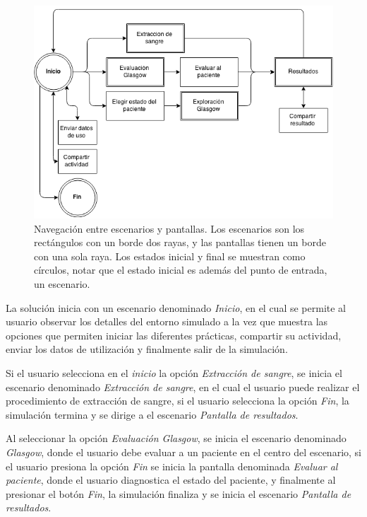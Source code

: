 \begin{figure}[H] 
\centering 
\includegraphics[scale=0.5]{propuesta/grafo_escenas.png}
\caption{Navegación entre escenarios y pantallas. Los escenarios son los
    rectángulos con un borde dos rayas, y las pantallas tienen un borde con una
    sola raya. Los estados inicial y final se muestran como círculos, notar que
    el estado inicial es además del punto de entrada, un escenario.}
\label{fig:grafo_estados}
\end{figure}

La solución inicia con un escenario denominado \emph{Inicio}, en el cual se
permite al usuario observar los detalles del entorno simulado a la vez que
muestra las opciones que permiten iniciar las diferentes prácticas, compartir
su actividad, enviar los datos de utilización y finalmente salir de la
simulación.

Si el usuario selecciona en el \emph{inicio} la opción \emph{Extracción de
    sangre}, se inicia el escenario denominado \emph{Extracción de sangre}, en
el cual el usuario puede realizar el procedimiento de extracción de sangre, si
el usuario selecciona la opción \emph{Fin}, la simulación termina y se dirige a
el escenario \emph{Pantalla de resultados}.

Al seleccionar la opción \emph{Evaluación Glasgow}, se inicia el escenario
denominado \emph{Glasgow}, donde el usuario debe evaluar a un paciente en el
centro del escenario, si el usuario presiona la opción \emph{Fin} se inicia la
pantalla denominada \emph{Evaluar al paciente}, donde el usuario diagnostica el
estado del paciente, y finalmente al presionar el botón \emph{Fin}, la
simulación finaliza y se inicia el escenario \emph{Pantalla de resultados}.

